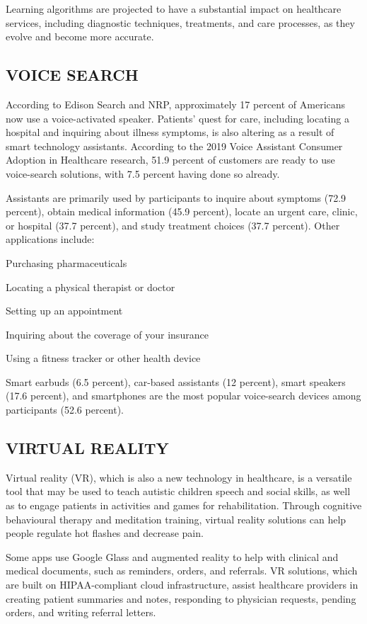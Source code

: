 \documentclass{article}
\begin{document}
Learning algorithms are projected to have a substantial impact on healthcare services, including diagnostic techniques, treatments, and care processes, as they evolve and become more accurate.

\subsection{VOICE SEARCH}

According to Edison Search and NRP, approximately 17 percent of Americans now use a voice-activated speaker.
Patients' quest for care, including locating a hospital and inquiring about illness symptoms, is also altering as a result of smart technology assistants. According to the 2019 Voice Assistant Consumer Adoption in Healthcare research, 51.9 percent of customers are ready to use voice-search solutions, with 7.5 percent having done so already.


Assistants are primarily used by participants to inquire about symptoms (72.9 percent), obtain medical information (45.9 percent), locate an urgent care, clinic, or hospital (37.7 percent), and study treatment choices (37.7 percent).
Other applications include:

Purchasing pharmaceuticals


Locating a physical therapist or doctor


Setting up an appointment


Inquiring about the coverage of your insurance


Using a fitness tracker or other health device


Smart earbuds (6.5 percent), car-based assistants (12 percent), smart speakers (17.6 percent), and smartphones are the most popular voice-search devices among participants (52.6 percent).

\subsection{VIRTUAL REALITY}

Virtual reality (VR), which is also a new technology in healthcare, is a versatile tool that may be used to teach autistic children speech and social skills, as well as to engage patients in activities and games for rehabilitation. Through cognitive behavioural therapy and meditation training, virtual reality solutions can help people regulate hot flashes and decrease pain.


Some apps use Google Glass and augmented reality to help with clinical and medical documents, such as reminders, orders, and referrals.
VR solutions, which are built on HIPAA-compliant cloud infrastructure, assist healthcare providers in creating patient summaries and notes, responding to physician requests, pending orders, and writing referral letters.
\end{document}

